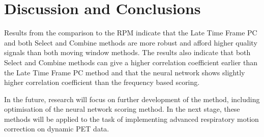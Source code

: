 

\section{Discussion and Conclusions} \label{sec:discussion_and_conclusions}
    Results from the comparison to the \gls{RPM} indicate that the Late Time Frame \gls{PC} and both Select and Combine methods are more robust and afford higher quality signals than both moving window methods. The results also indicate that both Select and Combine methods can give a higher correlation coefficient earlier than the Late Time Frame \gls{PC} method and that the neural network shows slightly higher correlation coefficient than the frequency based scoring.
    
    In the future, research will focus on further development of the method, including optimisation of the neural network scoring method. In the next stage, these methods will be applied to the task of implementing advanced respiratory motion correction on dynamic \gls{PET} data.